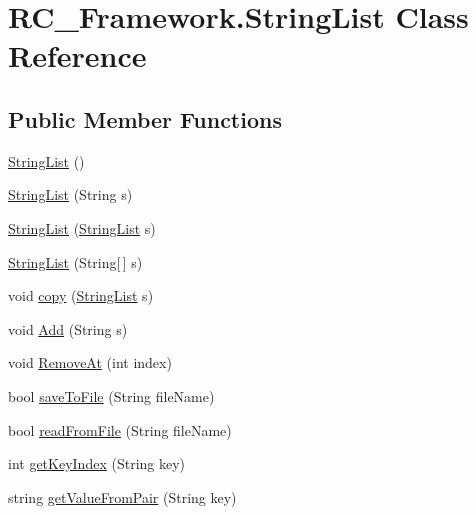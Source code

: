 \hypertarget{class_r_c___framework_1_1_string_list}{}\section{R\+C\+\_\+\+Framework.\+String\+List Class Reference}
\label{class_r_c___framework_1_1_string_list}
\subsection*{Public Member Functions}
\begin{DoxyCompactItemize}
\item 
\mbox{\hyperlink{class_r_c___framework_1_1_string_list_a15830868bec1d214ad9d63b8de6a269f}{String\+List}} ()
\item 
\mbox{\hyperlink{class_r_c___framework_1_1_string_list_a6d8f0e5ef2f2229546ed517efac50aaf}{String\+List}} (String s)
\item 
\mbox{\hyperlink{class_r_c___framework_1_1_string_list_abe34df8886543beda07e347a1e567dc6}{String\+List}} (\mbox{\hyperlink{class_r_c___framework_1_1_string_list}{String\+List}} s)
\item 
\mbox{\hyperlink{class_r_c___framework_1_1_string_list_ab2c7aac0ea3fe58dd14c5451b1866471}{String\+List}} (String\mbox{[}$\,$\mbox{]} s)
\item 
void \mbox{\hyperlink{class_r_c___framework_1_1_string_list_af9f8bc6ac0afd33cb5b4555d58b32da7}{copy}} (\mbox{\hyperlink{class_r_c___framework_1_1_string_list}{String\+List}} s)
\item 
void \mbox{\hyperlink{class_r_c___framework_1_1_string_list_ae234d015a0ab2579b4a521fc44b14bfc}{Add}} (String s)
\item 
void \mbox{\hyperlink{class_r_c___framework_1_1_string_list_ab93448ebf9b598dd90a4276688b757a3}{Remove\+At}} (int index)
\item 
bool \mbox{\hyperlink{class_r_c___framework_1_1_string_list_ab050494175f6976a06d9f4dcf83155d0}{save\+To\+File}} (String file\+Name)
\item 
bool \mbox{\hyperlink{class_r_c___framework_1_1_string_list_a7b002a0f101a996c18b361d823499a00}{read\+From\+File}} (String file\+Name)
\item 
int \mbox{\hyperlink{class_r_c___framework_1_1_string_list_a9882ab75329dccffe37b5e50561f4ea9}{get\+Key\+Index}} (String key)
\item 
string \mbox{\hyperlink{class_r_c___framework_1_1_string_list_a8ad8d18d7c3d790f828b91c7d47ad675}{get\+Value\+From\+Pair}} (String key)

\end{DoxyCompactItemize}
